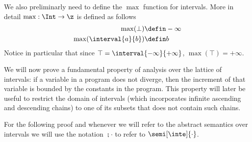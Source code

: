 We also preliminarly need to define the \(\max\) function for
intervals. More in detail \(\max : \Int \to \z\) is defined as follows
\begin{align*}
  \max(\bot) & \defin - \infty \\
  \max(\interval{a}{b}) & \defin b
\end{align*}
Notice in particular that since
\(\top = \interval{-\infty}{+\infty}\), \(\max(\top) = +\infty\).

We will now prove a fundamental property of analysis over the lattice
of intervals: if a variable in a program does not diverge, then the
increment of that variable is bounded by the constants in the
program. This property will later be useful to restrict the domain of
intervals (which incorporates infinite ascending and descending
chains) to one of its subsets that does not contain such chains.

\begin{notation}
  For the following proof and whenever we will refer to the abstract
  semantics over intervals we will use the notation \(\semi{\cdot}\)
  to refer to \(\semi[\inte]{\cdot}\).
\end{notation}

